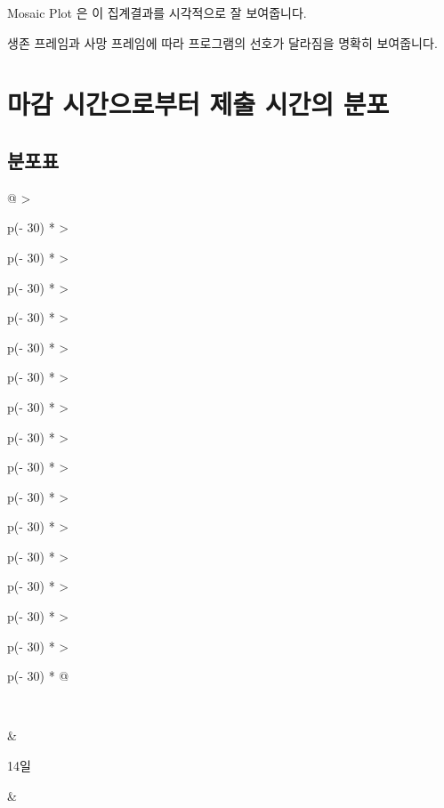 \documentclass[
]{book}
\begin{document}
Mosaic Plot 은 이 집계결과를 시각적으로 잘 보여줍니다.

생존 프레임과 사망 프레임에 따라 프로그램의 선호가 달라짐을 명확히 보여줍니다.

\section{마감 시간으로부터 제출 시간의 분포}\label{uxb9c8uxac10-uxc2dcuxac04uxc73cuxb85cuxbd80uxd130-uxc81cuxcd9c-uxc2dcuxac04uxc758-uxbd84uxd3ec-12}

\subsection{분포표}\label{uxbd84uxd3ecuxd45c-13}

\begin{longtable}[]{@{}
  >{\raggedright\arraybackslash}p{(\columnwidth - 30\tabcolsep) * }
  >{\raggedright\arraybackslash}p{(\columnwidth - 30\tabcolsep) * }
  >{\raggedright\arraybackslash}p{(\columnwidth - 30\tabcolsep) * }
  >{\raggedright\arraybackslash}p{(\columnwidth - 30\tabcolsep) * }
  >{\raggedright\arraybackslash}p{(\columnwidth - 30\tabcolsep) * }
  >{\raggedright\arraybackslash}p{(\columnwidth - 30\tabcolsep) * }
  >{\raggedright\arraybackslash}p{(\columnwidth - 30\tabcolsep) * }
  >{\raggedright\arraybackslash}p{(\columnwidth - 30\tabcolsep) * }
  >{\raggedright\arraybackslash}p{(\columnwidth - 30\tabcolsep) * }
  >{\raggedright\arraybackslash}p{(\columnwidth - 30\tabcolsep) * }
  >{\raggedright\arraybackslash}p{(\columnwidth - 30\tabcolsep) * }
  >{\raggedright\arraybackslash}p{(\columnwidth - 30\tabcolsep) * }
  >{\raggedright\arraybackslash}p{(\columnwidth - 30\tabcolsep) * }
  >{\raggedright\arraybackslash}p{(\columnwidth - 30\tabcolsep) * }
  >{\raggedright\arraybackslash}p{(\columnwidth - 30\tabcolsep) * }
  >{\raggedright\arraybackslash}p{(\columnwidth - 30\tabcolsep) * }@{}}
\caption{일 단위}\tabularnewline
\toprule\noalign{}
\begin{minipage}[b]{\linewidth}\raggedright
~
\end{minipage} & \begin{minipage}[b]{\linewidth}\raggedright
14일
\end{minipage} & \begin{minipage}[b]{\linewidth}\raggedright

\end{minipage}
\end{longtable}
\end{document}
